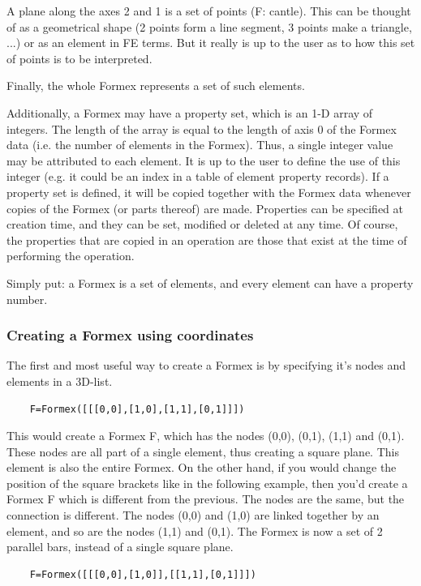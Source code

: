 \documentclass[a4paper]{manual}
\begin{document}
{    A plane along the axes 2 and 1 is a set of points (F: cantle). This can be
    thought of as a geometrical shape (2 points form a line segment, 3 points
    make a triangle, ...) or as an element in FE terms. But it really is up to
    the user as to how this set of points is to be interpreted.

    Finally, the whole Formex represents a set of such elements.

    Additionally, a Formex may have a property set, which is an 1-D array of
    integers. The length of the array is equal to the length of axis 0 of the
    Formex data (i.e. the number of elements in the Formex). Thus, a single
    integer value may be attributed to each element. It is up to the user to
    define the use of this integer (e.g. it could be an index in a table of
    element property records).
    If a property set is defined, it will be copied together with the Formex
    data whenever copies of the Formex (or parts thereof) are made.
    Properties can be specified at creation time, and they can be set,
    modified or deleted at any time. Of course, the properties that are
    copied in an operation are those that exist at the time of performing
    the operation.   

Simply put: a Formex is a set of elements, and every element can have a property number.

\subsubsection{Creating a Formex using coordinates}
The first and most useful way to create a Formex is by specifying it's nodes and elements in a 3D-list.  

\begin{verbatim}
	F=Formex([[[0,0],[1,0],[1,1],[0,1]]])
\end{verbatim}

This would create a Formex F, which has the nodes (0,0), (0,1), (1,1) and (0,1). These nodes are all part of a single element, thus creating a square plane. This element is also the entire Formex.
On the other hand, if you would change the position of the square brackets like in the following example, then you'd create a Formex F which is different from the previous. The nodes are the same, but the connection is different. The nodes (0,0) and (1,0) are linked together by an element, and so are the nodes (1,1) and (0,1). The Formex is now a set of 2 parallel bars, instead of a single square plane. 
\begin{verbatim}
	F=Formex([[[0,0],[1,0]],[[1,1],[0,1]]])
\end{verbatim}

}
\end{document}
